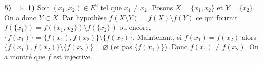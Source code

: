{\begin{enumerate}
{\textbf{5) $\Rightarrow$ 1)} Soit $(x_1,x_2)\in E^2$ tel que $x_1\neq x_2$. Posons $X=\{x_1,x_2\}$ et $Y=\{x_2\}$.
On a
donc $Y\subset X$. Par hypothèse $f(X\setminus Y)=f(X)\setminus f(Y)$ ce qui fournit
$f(\{x_1\})=f(\{x_1,x_2\})\setminus f(\{x_2\})$ ou encore, $\{f(x_1)\}=\{f(x_1),f(x_2)\}\setminus\{f(x_2)\}$.
Maintenant, si $f(x_1)=f(x_2)$ alors $\{f(x_1),f(x_2)\}\setminus\{f(x_2)\}=\varnothing$ (et pas $\{f(x_1)\}$). Donc
$f(x_1)\neq f(x_2)$.
On a montré que $f$ est injective.
}
\end{enumerate}
}
